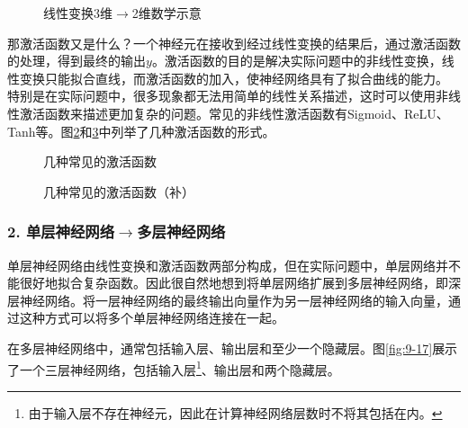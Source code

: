 \begin{figure}[htp]
\centering

\caption{线性变换3维$ \rightarrow $2维数学示意}
\label{fig:9-14}
\end{figure}

\parinterval 那激活函数又是什么？一个神经元在接收到经过线性变换的结果后，通过激活函数的处理，得到最终的输出$ y $。激活函数的目的是解决实际问题中的非线性变换，线性变换只能拟合直线，而激活函数的加入，使神经网络具有了拟合曲线的能力。 特别是在实际问题中，很多现象都无法用简单的线性关系描述，这时可以使用非线性激活函数来描述更加复杂的问题。常见的非线性激活函数有Sigmoid、ReLU、Tanh等。图\ref{fig:9-15}和\ref{fig:9-15-2}中列举了几种激活函数的形式。

\begin{figure}[htp]
\centering

\caption{几种常见的激活函数}
\label{fig:9-15}
\end{figure}
\begin{figure}[htp]
\centering

\caption{几种常见的激活函数（补）}
\label{fig:9-15-2}
\end{figure}


\vspace{-0.5em}
\subsubsection{2. 单层神经网络$\rightarrow$多层神经网络}

\parinterval 单层神经网络由线性变换和激活函数两部分构成，但在实际问题中，单层网络并不能很好地拟合复杂函数。因此很自然地想到将单层网络扩展到多层神经网络，即深层神经网络。将一层神经网络的最终输出向量作为另一层神经网络的输入向量，通过这种方式可以将多个单层神经网络连接在一起。

\parinterval 在多层神经网络中，通常包括输入层、输出层和至少一个隐藏层。图\ref{fig:9-17}展示了一个三层神经网络，包括输入层\footnote{由于输入层不存在神经元，因此在计算神经网络层数时不将其包括在内。}、输出层和两个隐藏层。

